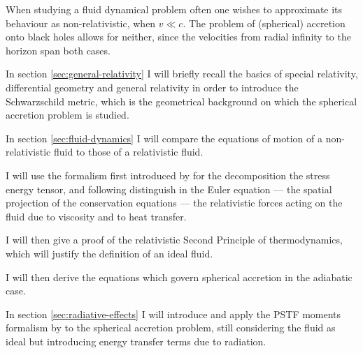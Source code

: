 \documentclass[main.tex]{subfiles}
\begin{document}
When studying a fluid dynamical problem often one wishes to approximate its behaviour as non-relativistic, when \(v \ll c\).
The problem of (spherical) accretion onto black holes allows for neither, since the velocities from radial infinity to the horizon span both cases.

In section \ref{sec:general-relativity} I will briefly recall the basics of special relativity, differential geometry and general relativity in order to introduce the Schwarzschild metric, which is the geometrical background on which the spherical accretion problem is studied.

In section \ref{sec:fluid-dynamics} I will compare the equations of motion of a non-relativistic fluid to those of a relativistic fluid.

I will use the formalism first introduced by \textcite[]{Eckart:1940} for the decomposition the stress energy tensor, and following \textcite[]{Taub:1978} distinguish in the Euler equation --- the spatial projection of the conservation equations --- the relativistic forces acting on the fluid due to viscosity and to heat transfer.

I will then give a proof of the relativistic Second Principle of thermodynamics, which will justify the definition of an ideal fluid.

I will then derive the equations which govern spherical accretion in the adiabatic case.

In section \ref{sec:radiative-effects} I will introduce and apply the PSTF moments formalism by \textcite[]{Thorne:1981feb} to the spherical accretion problem, still considering the fluid as ideal but introducing energy transfer terms due to radiation.
\end{document}
